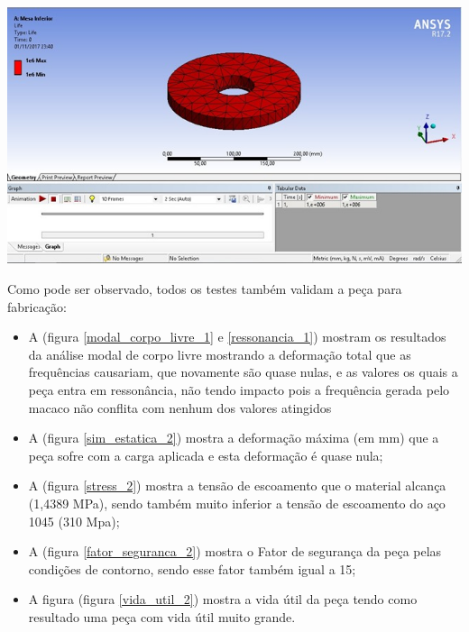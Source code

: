     \begin{center}
    	\includegraphics[scale=0.7]{figuras/vida_util_2}
        \label{vida_util_2}
    \end{center}

    Como pode ser observado, todos os testes também validam a peça para fabricação:
    \begin{itemize}
        \item A (figura \ref{modal_corpo_livre_1} e  \ref{ressonancia_1}) mostram os resultados da análise modal de corpo livre mostrando a deformação total que as frequências causariam, que novamente são quase nulas, e as valores os quais a peça entra em ressonância, não tendo impacto pois a frequência gerada pelo macaco não conflita com nenhum dos valores atingidos
        \item A (figura \ref{sim_estatica_2}) mostra a deformação máxima (em mm) que a peça sofre com a carga aplicada e esta deformação é quase nula;
        \item A (figura \ref{stress_2}) mostra a tensão de escoamento que o material alcança (1,4389 MPa), sendo também muito inferior a tensão de escoamento do aço 1045 (310 Mpa);
        \item A (figura \ref{fator_seguranca_2}) mostra o Fator de segurança da peça pelas condições de contorno, sendo esse fator também igual a 15;
        \item A figura (figura \ref{vida_util_2}) mostra a vida útil da peça tendo como resultado uma peça com vida útil muito grande.
    \end{itemize}

